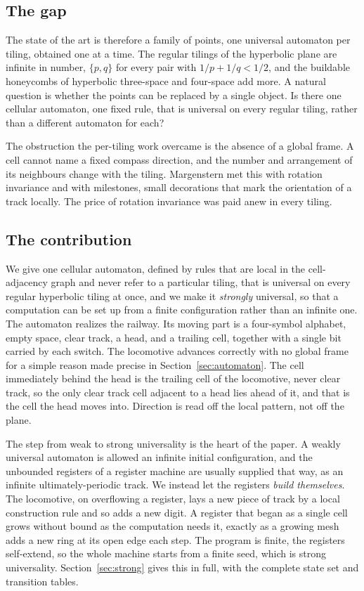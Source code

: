 \subsection{The gap}

The state of the art is therefore a family of points, one universal automaton per tiling, obtained one at a
time. The regular tilings of the hyperbolic plane are infinite in number, $\{p,q\}$ for every pair with
$1/p + 1/q < 1/2$, and the buildable honeycombs of hyperbolic three-space and four-space add more. A natural
question is whether the points can be replaced by a single object. Is there one cellular automaton, one fixed
rule, that is universal on every regular tiling, rather than a different automaton for each?

The obstruction the per-tiling work overcame is the absence of a global frame. A cell cannot name a fixed
compass direction, and the number and arrangement of its neighbours change with the tiling. Margenstern met
this with rotation invariance and with milestones, small decorations that mark the orientation of a track
locally. The price of rotation invariance was paid anew in every tiling.

\subsection{The contribution}

We give one cellular automaton, defined by rules that are local in the cell-adjacency graph and never refer to
a particular tiling, that is universal on every regular hyperbolic tiling at once, and we make it \textit{strongly}
universal, so that a computation can be set up from a finite configuration rather than an infinite one. The
automaton realizes the railway. Its moving part is a four-symbol alphabet, empty space, clear track, a head,
and a trailing cell, together with a single bit carried by each switch. The locomotive advances correctly with
no global frame for a simple reason made precise in Section~\ref{sec:automaton}. The cell immediately behind the
head is the trailing cell of the locomotive, never clear track, so the only clear track cell adjacent to a head
lies ahead of it, and that is the cell the head moves into. Direction is read off the local pattern, not off
the plane.

The step from weak to strong universality is the heart of the paper. A weakly universal automaton is allowed an
infinite initial configuration, and the unbounded registers of a register machine are usually supplied that
way, as an infinite ultimately-periodic track. We instead let the registers \textit{build themselves}. The locomotive,
on overflowing a register, lays a new piece of track by a local construction rule and so adds a new digit. A
register that began as a single cell grows without bound as the computation needs it, exactly as a growing mesh
adds a new ring at its open edge each step. The program is finite, the registers self-extend, so the whole
machine starts from a finite seed, which is strong universality. Section~\ref{sec:strong} gives this in full,
with the complete state set and transition tables.

